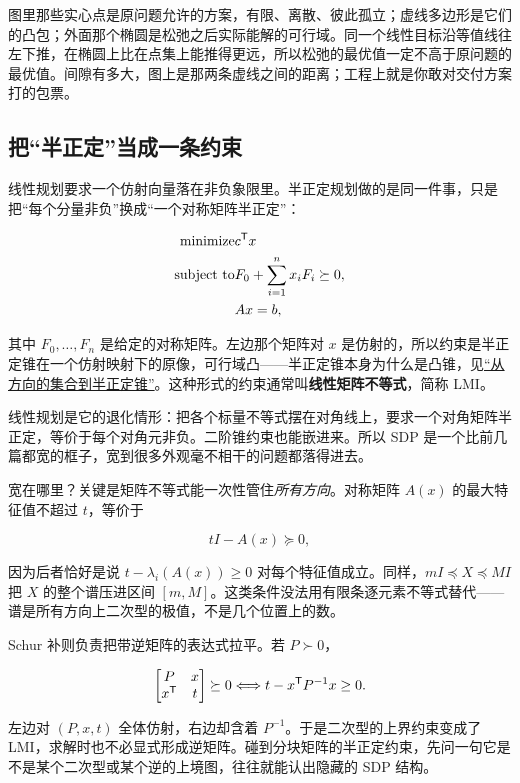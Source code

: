 图里那些实心点是原问题允许的方案，有限、离散、彼此孤立；虚线多边形是它们的凸包；外面那个椭圆是松弛之后实际能解的可行域。同一个线性目标沿等值线往左下推，在椭圆上比在点集上能推得更远，所以松弛的最优值一定不高于原问题的最优值。间隙有多大，图上是那两条虚线之间的距离；工程上就是你敢对交付方案打的包票。

\subsection{把``半正定''当成一条约束}

线性规划要求一个仿射向量落在非负象限里。半正定规划做的是同一件事，只是把``每个分量非负''换成``一个对称矩阵半正定''：

\[
\begin{aligned}
\text{minimize}\space&c^{\mathsf{T}}x\\
\text{subject to}\space&F_0+\sum_{i=1}^{n}x_iF_i\succeq0,\\
&Ax=b,
\end{aligned}
\]

其中 \(F_0,\ldots,F_n\) 是给定的对称矩阵。左边那个矩阵对 \(x\) 是仿射的，所以约束是半正定锥在一个仿射映射下的原像，可行域凸——半正定锥本身为什么是凸锥，见\hyperref[sec:09-Convex-Optimization/02-Convex-Sets/03]{``从方向的集合到半正定锥''}。这种形式的约束通常叫\textbf{线性矩阵不等式}，简称 LMI。

线性规划是它的退化情形：把各个标量不等式摆在对角线上，要求一个对角矩阵半正定，等价于每个对角元非负。二阶锥约束也能嵌进来。所以 SDP 是一个比前几篇都宽的框子，宽到很多外观毫不相干的问题都落得进去。

宽在哪里？关键是矩阵不等式能一次性管住\emph{所有方向}。对称矩阵 \(A(x)\) 的最大特征值不超过 \(t\)，等价于

\[
tI-A(x)\succeq0,
\]

因为后者恰好是说 \(t-\lambda_i(A(x))\ge0\) 对每个特征值成立。同样，\(mI\preceq X\preceq MI\) 把 \(X\) 的整个谱压进区间 \([m,M]\)。这类条件没法用有限条逐元素不等式替代——谱是所有方向上二次型的极值，不是几个位置上的数。

Schur 补则负责把带逆矩阵的表达式拉平。若 \(P\succ0\)，

\[
\begin{bmatrix}P&x\\x^{\mathsf{T}}&t\end{bmatrix}\succeq0
\space\Longleftrightarrow\space
t-x^{\mathsf{T}}P^{-1}x\ge0 .
\]

左边对 \((P,x,t)\) 全体仿射，右边却含着 \(P^{-1}\)。于是二次型的上界约束变成了 LMI，求解时也不必显式形成逆矩阵。碰到分块矩阵的半正定约束，先问一句它是不是某个二次型或某个逆的上境图，往往就能认出隐藏的 SDP 结构。

